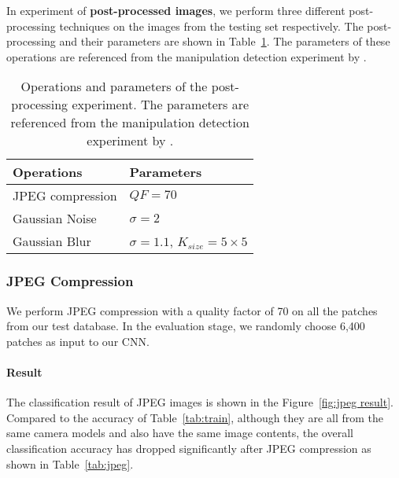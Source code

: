 \documentclass[a4paper, 9pt, twocolumn]{extarticle}
\begin{document}
In experiment of \textbf{post-processed images}, we perform three different post-processing techniques on the images from the testing set respectively. The post-processing and their parameters are shown in Table~\ref{tab:post}. The parameters of these operations are referenced from the manipulation detection experiment by \citeauthor{bayar2017design} \cite{bayar2017design}.

\begin{table}
	\center
	\begin{tabular}{|p{3cm}|p{3cm}|}
		\hline
		Operations & Parameters \\
		\hline
		JPEG compression & $QF = 70$ \\
		Gaussian Noise & $\sigma = 2$ \\
		Gaussian Blur & $\sigma = 1.1$, $K_{size} = 5 \times 5$ \\
		\hline
	\end{tabular}
	\caption{\label{tab:post} Operations and parameters of the post-processing experiment. The parameters are referenced from the manipulation detection experiment by \citeauthor{bayar2017design} \cite{bayar2017design}.}
\end{table}

\subsubsection{JPEG Compression}
\label{section:jpeg}

We perform JPEG compression with a quality factor of 70 on all the patches from our test database. In the evaluation stage, we randomly choose 6,400 patches as input to our CNN.

\paragraph{Result}
\label{section:jpeg result}

The classification result of JPEG images is shown in the Figure~\ref{fig:jpeg result}. Compared to the accuracy of Table~\ref{tab:train}, although they are all from the same camera models and also have the same image contents, the overall classification accuracy has dropped significantly after JPEG compression as shown in Table~\ref{tab:jpeg}.
\end{document}
